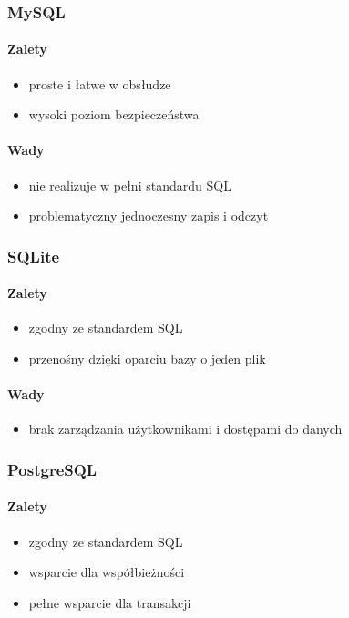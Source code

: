 \documentclass[a4paper,12pt,twoside]{article}
\begin{document}
\subsubsection{MySQL}
\paragraph{Zalety}
\begin{itemize}
\item{proste i łatwe w obsłudze}
\item{wysoki poziom bezpieczeństwa}
\end{itemize}
\paragraph{Wady}
\begin{itemize}
\item{nie realizuje w pełni standardu SQL}
\item{problematyczny jednoczesny zapis i odczyt}
\end{itemize}
\subsubsection{SQLite}
\paragraph{Zalety}
\begin{itemize}
\item{zgodny ze standardem SQL}
\item{przenośny dzięki oparciu bazy o jeden plik}
\end{itemize}
\paragraph{Wady}
\begin{itemize}
\item{brak zarządzania użytkownikami i dostępami do danych}
\end{itemize}

\subsubsection{PostgreSQL}
\paragraph{Zalety}
\begin{itemize}
\item{zgodny ze standardem SQL}
\item{wsparcie dla współbieżności}
\item{pełne wsparcie dla transakcji}
\end{itemize}
\end{document}
